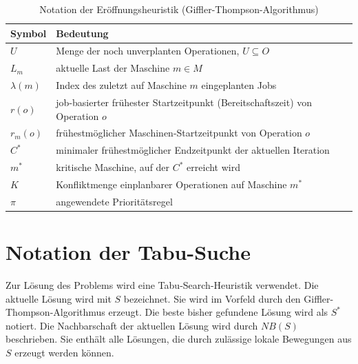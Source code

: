 \begin{table}[H]
    \centering
    \caption{Notation der Eröffnungsheuristik (Giffler-Thompson-Algorithmus)}
    \label{tab:notation_gt}
    \begin{tabular}{ll}
        \hline
        \textbf{Symbol} & \textbf{Bedeutung}                                                             \\
        \hline
        \(U\)           & Menge der noch unverplanten Operationen, \(U \subseteq O\)                     \\
        \(L_m\)         & aktuelle Last der Maschine \(m \in M\)                                         \\
        \(\lambda(m)\)  & Index des zuletzt auf Maschine \(m\) eingeplanten Jobs                         \\
        \(r(o)\)        & job-basierter frühester Startzeitpunkt (Bereitschaftszeit) von Operation \(o\) \\
        \(r_m(o)\)      & frühestmöglicher Maschinen-Startzeitpunkt von Operation \(o\)                  \\
        \(C^*\)         & minimaler frühestmöglicher Endzeitpunkt der aktuellen Iteration                \\
        \(m^*\)         & kritische Maschine, auf der \(C^*\) erreicht wird                              \\
        \(K\)           & Konfliktmenge einplanbarer Operationen auf Maschine \(m^*\)                    \\
        \(\pi\)         & angewendete Prioritätsregel                                                    \\
        \hline
    \end{tabular}
\end{table}


\section*{Notation der Tabu-Suche}

Zur Lösung des Problems wird eine Tabu-Search-Heuristik verwendet. Die aktuelle Lösung wird mit \(S\) bezeichnet.
Sie wird im Vorfeld durch den Giffler-Thompson-Algorithmus erzeugt.
Die beste bisher gefundene Lösung wird als \(S^\ast\) notiert.
Die Nachbarschaft der aktuellen Lösung wird durch \(NB(S)\) beschrieben.
Sie enthält alle Lösungen, die durch zulässige lokale Bewegungen aus \(S\) erzeugt werden können.

